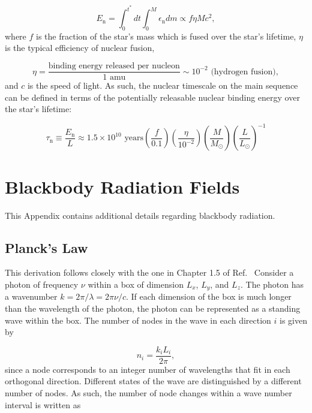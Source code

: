 \documentclass[12pt]{article}
\newcommand{\bigparenthesis}[1]{\left(#1\right)}
\begin{document}
\begin{equation}
    E_\mathrm{n} = \int_0^{t^*} dt \int_0^M \epsilon_\mathrm{n} dm \propto f \eta M c^2,
\end{equation}
%
where $f$ is the fraction of the star's mass which is fused over the star's lifetime, $\eta$ is the typical efficiency of nuclear fusion, 

\begin{equation}
    \eta = \frac{\text{binding energy released per nucleon}}{1 \text{ amu}} \sim 10^{-2} \text{ (hydrogen fusion)},
\end{equation}
%
and $c$ is the speed of light. As such, the nuclear timescale on the main sequence can be defined in terms of the potentially releasable nuclear binding energy over the star's lifetime:

\begin{equation}
    \tau_\mathrm{n} \equiv \frac{E_\mathrm{n}}{L} \approx 1.5 \times 10^{10} \text{ years} \bigparenthesis{\frac{f}{0.1}}\bigparenthesis{\frac{\eta}{10^{-2}}} \bigparenthesis{\frac{M}{M_\odot}} \bigparenthesis{\frac{L}{L_\odot}}^{-1}
\end{equation}
\pagebreak

\setcounter{equation}{0}
\section{Blackbody Radiation Fields} \label{ap:blackbody}
This Appendix contains additional details regarding blackbody radiation.

\subsection{Planck's Law}
This derivation follows closely with the one in Chapter 1.5 of Ref.~\cite{Rybicki1979} Consider a photon of frequency $\nu$ within a box of dimension $L_x$, $L_y$, and $L_z$. The photon has a wavenumber $k = 2\pi/\lambda = 2\pi\nu/c$. If each dimension of the box is much longer than the wavelength of the photon, the photon can be represented as a standing wave within the box. The number of nodes in the wave in each direction $i$ is given by

\begin{equation}
    n_i = \frac{k_i L_i}{2\pi},
\end{equation}
%
since a node corresponds to an integer number of wavelengths that fit in each orthogonal direction. Different states of the wave are distinguished by a different number of nodes. As such, the number of node changes within a wave number interval is written as 
\end{document}
